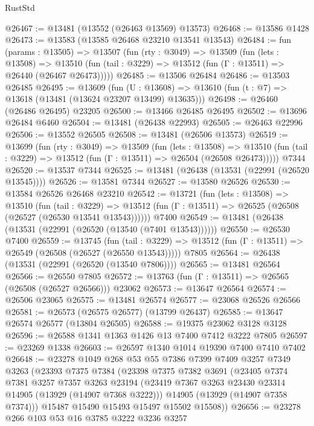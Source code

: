 \begin{lexlean}{RustStd}
\begin{coremodule}
@26467 := @13481 (@13552 (@26463 @13569) @13573)
@26468 := @13586 @1428
@26473 := @13583 (@13585 @26468 @23210 @13541 @13543)
@26484 := fun (params : @13505) =>
  @13507
    (fun (rty : @3049) =>
    @13509
      (fun (lets : @13508) =>
      @13510 (fun (tail : @3229) => @13512 (fun (Γ : @13511) => @26440 (@26467 @26473)))))
@26485 := @13506 @26484
@26486 := @13503 @26485
@26495 := @13609
    (fun (U : @13608) => @13610 (fun (t : @7) => @13618 (@13481 (@13624 @23207 @13499) @13635)))
@26498 := @26460 (@26486 @26495) @23205
@26500 := @13466 @26485 @26495
@26502 := @13696 @26484 @6460
@26504 := @13481 (@26438 @22993)
@26505 := @26463 @22996
@26506 := @13552 @26505
@26508 := @13481 (@26506 @13573)
@26519 := @13699
    (fun (rty : @3049) =>
    @13509
      (fun (lets : @13508) =>
      @13510 (fun (tail : @3229) => @13512 (fun (Γ : @13511) => @26504 (@26508 @26473)))))
    @7344
@26520 := @13537 @7344
@26525 := @13481 (@26438 (@13531 (@22991 (@26520 @13545))))
@26526 := @13581 @7344
@26527 := @13580 @26526
@26530 := @13584 @26526 @26468 @23210
@26542 := @13721
    (fun (lets : @13508) =>
    @13510
      (fun (tail : @3229) =>
      @13512 (fun (Γ : @13511) => @26525 (@26508 (@26527 (@26530 @13541 @13543))))))
    @7400
@26549 := @13481 (@26438 (@13531 (@22991 (@26520 (@13540 (@7401 @13543))))))
@26550 := @26530 @7400
@26559 := @13745
    (fun (tail : @3229) => @13512 (fun (Γ : @13511) => @26549 (@26508 (@26527 (@26550 @13543)))))
    @7805
@26564 := @26438 (@13531 (@22991 (@26520 (@13540 @7806))))
@26565 := @13481 @26564
@26566 := @26550 @7805
@26572 := @13763 (fun (Γ : @13511) => @26565 (@26508 (@26527 @26566))) @23062
@26573 := @13647 @26564
@26574 := @26506 @23065
@26575 := @13481 @26574
@26577 := @23068 @26526 @26566
@26581 := @26573 (@26575 @26577) (@13799 @26437)
@26585 := @13647 @26574 @26577 (@13804 @26505)
@26588 := @19375 @23062 @3128 @3128
@26596 := @26588 @1341 @1363 @1426 @13 @7400 @7412 @3222 @7805
@26597 := @23269 @1338
@26603 := @26597 @1340 @1014 @19390 @7400 @7410 @7402
@26648 := @23278
    @1049
    @268
    @53
    @55
    @7386
    @7399
    @7409
    @3257
    @7349
    @3263
    (@23393
      @7375
      @7384
      (@23398
        @7375
        @7382
        @3691
        (@23405
          @7374
          @7381
          @3257
          @7357
          @3263
          @23194
          (@23419 @7367 @3263 @23430 @23314 @14905 (@13929 (@14907 @7368 @3222)))
          @14905
          (@13929 (@14907 @7358 @7374)))
        @15487
        @15490
        @15493
        @15497
        @15502
        @15508))
@26656 := @23278 @266 @103 @53 @16 @3785 @3222 @3236 @3257

\end{coremodule}
\end{lexlean}
